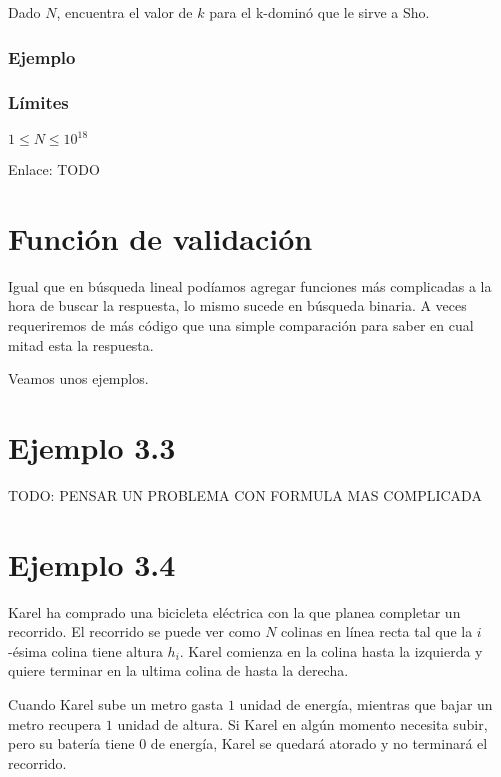 Dado \(N\), encuentra el valor de \(k\) para el k-dominó que le sirve a Sho.

\subsubsection*{Ejemplo}
\begin{casebox2}
\end{casebox2}

\subsubsection*{Límites}
\begin{plimits}
	\item \(1\leq N \leq 10^{18}\)
\end{plimits}

Enlace: TODO

\section*{Función de validación}
Igual que en búsqueda lineal podíamos agregar funciones más complicadas a la hora de buscar la respuesta, lo mismo sucede en búsqueda binaria. A veces requeriremos de más código que una simple comparación para saber en cual mitad esta la respuesta.

Veamos unos ejemplos.


\section*{Ejemplo 3.3}
TODO: PENSAR UN PROBLEMA CON FORMULA MAS COMPLICADA

\section*{Ejemplo 3.4}
Karel ha comprado una bicicleta eléctrica con la que planea completar un recorrido. El recorrido se puede ver como \(N\) colinas en línea recta tal que la \(i\)-ésima colina tiene altura \(h_i\). Karel comienza en la colina hasta la izquierda y quiere terminar en la ultima colina de hasta la derecha.

Cuando Karel sube un metro gasta \(1\) unidad de energía, mientras que bajar un metro recupera \(1\) unidad de altura. Si Karel en algún momento necesita subir, pero su batería tiene 0 de energía, Karel se quedará atorado y no terminará el recorrido.

